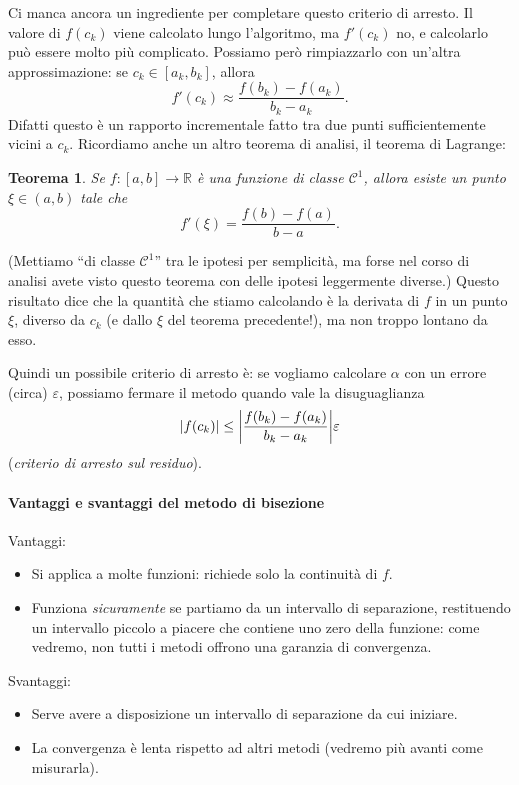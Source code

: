 \documentclass[a4paper]{report}
\DeclarePairedDelimiter{\abs}{\lvert}{\rvert}
\newtheorem{theorem}{Teorema}[chapter]
\theoremstyle{definition}
\theoremstyle{remark}
\begin{document}
Ci manca ancora un ingrediente per completare questo criterio di arresto. Il valore di $f(c_k)$ viene calcolato lungo l'algoritmo, ma $f'(c_k)$ no, e calcolarlo può essere molto più complicato. Possiamo però rimpiazzarlo con un'altra approssimazione: se $c_k \in [a_k, b_k]$, allora
\[
f'(c_k) \approx \frac{f(b_k) - f(a_k)}{b_k - a_k}.
\]
Difatti questo è un rapporto incrementale fatto tra due punti sufficientemente vicini a $c_k$. Ricordiamo anche un altro teorema di analisi, il teorema di Lagrange:
\begin{theorem}
    Se $f: [a,b] \to \mathbb{R}$ è una funzione di classe $\mathcal{C}^1$, allora esiste un punto $\xi \in (a,b)$ tale che
    \[
        f'(\xi) = \frac{f(b)-f(a)}{b-a}.
    \]
\end{theorem}
(Mettiamo ``di classe $\mathcal{C}^1$'' tra le ipotesi per semplicità, ma forse nel corso di analisi avete visto questo teorema con delle ipotesi leggermente diverse.) Questo risultato dice che la quantità che stiamo calcolando è la derivata di $f$ in un punto $\xi$, diverso da $c_k$ (e dallo $\xi$ del teorema precedente!), ma non troppo lontano da esso.

Quindi un possibile criterio di arresto è: se vogliamo calcolare $\alpha$ con un errore (circa) $\varepsilon$, possiamo fermare il metodo quando vale la disuguaglianza 
\[
\abs{f(c_k)} \leq \abs*{\frac{f(b_k) - f(a_k)}{b_k-a_k}} \varepsilon
\]
(\emph{criterio di arresto sul residuo}).

\paragraph{Vantaggi e svantaggi del metodo di bisezione}

Vantaggi:

\begin{itemize}
    \item Si applica a molte funzioni: richiede solo la continuità di $f$.
    \item Funziona \emph{sicuramente} se partiamo da un intervallo di separazione, restituendo un intervallo piccolo a piacere che contiene uno zero della funzione: come vedremo, non tutti i metodi offrono una garanzia di convergenza.
\end{itemize}

Svantaggi:

\begin{itemize}
    \item Serve avere a disposizione un intervallo di separazione da cui iniziare.
    \item La convergenza è lenta rispetto ad altri metodi (vedremo più avanti come misurarla).
\end{itemize}
\end{document}
